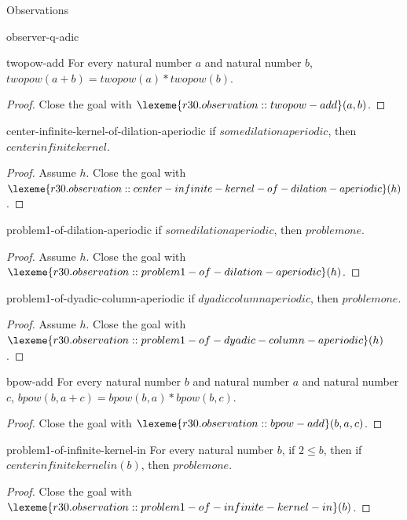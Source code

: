 \begin{lexlean}{Observations}
\begin{section}{observer-q-adic}
\begin{theorem}{twopow-add}
For every natural number \(a\) and natural number \(b\), \(twopow(a + b) = twopow(a) * twopow(b)\).
\begin{proof}
Close the goal with \(\lexeme{r30.observation::twopow-add}(a, b)\).
\end{proof}
\end{theorem}

\begin{theorem}{center-infinite-kernel-of-dilation-aperiodic}
if \(somedilationaperiodic\), then \(centerinfinitekernel\).
\begin{proof}
Assume \(h\).
Close the goal with \(\lexeme{r30.observation::center-infinite-kernel-of-dilation-aperiodic}(h)\).
\end{proof}
\end{theorem}

\begin{theorem}{problem1-of-dilation-aperiodic}
if \(somedilationaperiodic\), then \(problemone\).
\begin{proof}
Assume \(h\).
Close the goal with \(\lexeme{r30.observation::problem1-of-dilation-aperiodic}(h)\).
\end{proof}
\end{theorem}

\begin{theorem}{problem1-of-dyadic-column-aperiodic}
if \(dyadiccolumnaperiodic\), then \(problemone\).
\begin{proof}
Assume \(h\).
Close the goal with \(\lexeme{r30.observation::problem1-of-dyadic-column-aperiodic}(h)\).
\end{proof}
\end{theorem}

\begin{theorem}{bpow-add}
For every natural number \(b\) and natural number \(a\) and natural number \(c\), \(bpow(b, a + c) = bpow(b, a) * bpow(b, c)\).
\begin{proof}
Close the goal with \(\lexeme{r30.observation::bpow-add}(b, a, c)\).
\end{proof}
\end{theorem}

\begin{theorem}{problem1-of-infinite-kernel-in}
For every natural number \(b\), if \(2 ≤ b\), then if \(centerinfinitekernelin(b)\), then \(problemone\).
\begin{proof}
Close the goal with \(\lexeme{r30.observation::problem1-of-infinite-kernel-in}(b)\).
\end{proof}
\end{theorem}


\end{section}
\end{lexlean}
